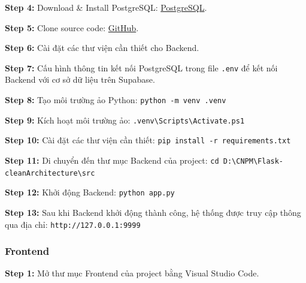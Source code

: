 \textbf{Step 4:} Download \& Install PostgreSQL:
\href{https://www.postgresql.org/download/windows/}{PostgreSQL}.

\vspace{0.3cm}

\textbf{Step 5:} Clone source code:
\href{https://github.com/nahnht27/CNPM}{GitHub}.

\vspace{0.3cm}

\textbf{Step 6:} Cài đặt các thư viện cần thiết cho Backend.

\vspace{0.3cm}

\textbf{Step 7:} Cấu hình thông tin kết nối PostgreSQL trong file
\texttt{.env} để kết nối Backend với cơ sở dữ liệu trên Supabase.

\vspace{0.3cm}

\textbf{Step 8:} Tạo môi trường ảo Python:
\verb|python -m venv .venv|

\vspace{0.3cm}

\textbf{Step 9:} Kích hoạt môi trường ảo:
\verb|.venv\Scripts\Activate.ps1|

\vspace{0.3cm}

\textbf{Step 10:} Cài đặt các thư viện cần thiết:
\verb|pip install -r requirements.txt|

\vspace{0.3cm}

\textbf{Step 11:} Di chuyển đến thư mục Backend của project:
\verb|cd D:\CNPM\Flask-cleanArchitecture\src|

\vspace{0.3cm}

\textbf{Step 12:} Khởi động Backend:
\verb|python app.py|

\vspace{0.3cm}

\textbf{Step 13:} Sau khi Backend khởi động thành công, hệ thống được truy cập thông qua địa chỉ:
\verb|http://127.0.0.1:9999|

\subsubsection{Frontend}

\textbf{Step 1:} Mở thư mục Frontend của project bằng Visual Studio Code.

\vspace{0.3cm}

